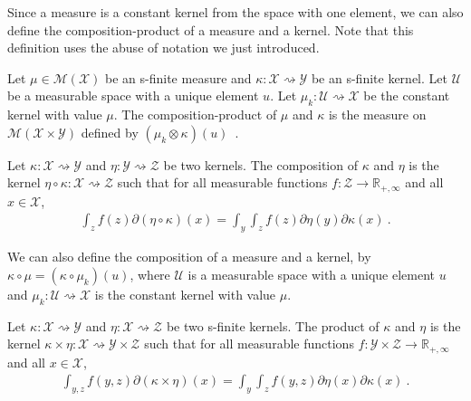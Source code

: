 Since a measure is a constant kernel from the space with one element, we can also define the composition-product of a measure and a kernel. Note that this definition uses the abuse of notation we just introduced.

\begin{definition}
  \label{def:measure_compProd}
  \mathlibok
  Let $\mu \in \mathcal M(\mathcal X)$ be an s-finite measure and $\kappa : \mathcal X \rightsquigarrow \mathcal Y$ be an s-finite kernel.
  Let $\mathcal U$ be a measurable space with a unique element $u$. Let $\mu_k : \mathcal U \rightsquigarrow \mathcal X$ be the constant kernel with value $\mu$.
  The composition-product of $\mu$ and $\kappa$ is the measure on $\mathcal M(\mathcal X \times \mathcal Y)$ defined by $(\mu_k \otimes \kappa) (u)$~.
\end{definition}

\begin{definition}[Composition]
  \label{def:kernel_comp}
  \mathlibok
  Let $\kappa : \mathcal X \rightsquigarrow \mathcal Y$ and $\eta : \mathcal Y \rightsquigarrow \mathcal Z$ be two kernels.
  The composition of $\kappa$ and $\eta$ is the kernel $\eta \circ \kappa : \mathcal X \rightsquigarrow \mathcal Z$ such that for all measurable functions $f : \mathcal Z \to \mathbb{R}_{+,\infty}$ and all $x \in \mathcal X$,
  \begin{align*}
  \int_z f(z) \partial(\eta \circ \kappa)(x) = \int_y \int_z f(z) \partial\eta(y) \partial\kappa(x) \: .
  \end{align*}
\end{definition}

We can also define the composition of a measure and a kernel, by $\kappa \circ \mu = (\kappa \circ \mu_k) (u)$, where $\mathcal U$ is a measurable space with a unique element $u$ and $\mu_k : \mathcal U \rightsquigarrow \mathcal X$ is the constant kernel with value $\mu$.

\begin{definition}[Product]
  \label{def:kernel_prod}
  \mathlibok
  Let $\kappa : \mathcal X \rightsquigarrow \mathcal Y$ and $\eta : \mathcal X \rightsquigarrow \mathcal Z$ be two s-finite kernels.
  The product of $\kappa$ and $\eta$ is the kernel $\kappa \times \eta : \mathcal X \rightsquigarrow \mathcal Y \times \mathcal Z$ such that for all measurable functions $f : \mathcal Y \times \mathcal Z \to \mathbb{R}_{+,\infty}$ and all $x \in \mathcal X$,
  \begin{align*}
  \int_{y,z} f(y,z) \partial(\kappa \times \eta)(x) = \int_y \int_z f(y,z) \partial\eta(x) \partial\kappa(x) \: .
  \end{align*}
\end{definition}

